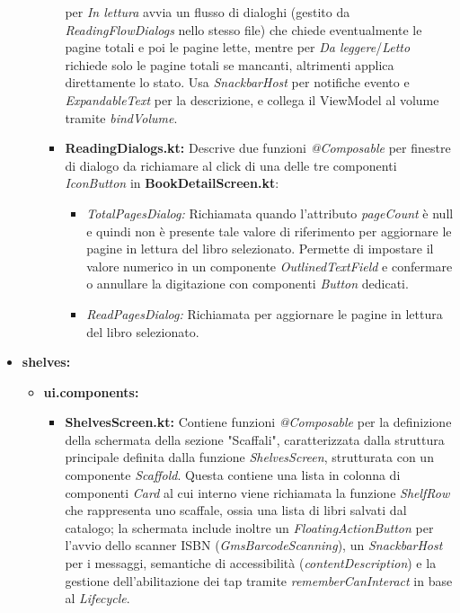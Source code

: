 \documentclass{article}
\begin{document}
\begin{itemize}
\begin{itemize}
\begin{itemize}
      per \textit{In lettura} avvia un flusso di dialoghi (gestito da \textit{ReadingFlowDialogs} nello stesso file) che chiede eventualmente le pagine totali e poi le pagine lette, mentre per \textit{Da leggere}/\textit{Letto} 
      richiede solo le pagine totali se mancanti, altrimenti applica direttamente lo stato. Usa \textit{SnackbarHost} per notifiche evento e \textit{ExpandableText} per la descrizione, e collega il ViewModel al volume tramite \textit{bindVolume}.
      \item \textbf{ReadingDialogs.kt:} Descrive due funzioni \textit{@Composable} per finestre di dialogo da richiamare al click di una delle tre componenti \textit{IconButton} in \textbf{BookDetailScreen.kt}:
      \begin{itemize}
        \item \textit{TotalPagesDialog:} Richiamata quando l'attributo \textit{pageCount} è null e quindi non è presente tale valore di riferimento per aggiornare le pagine in lettura del libro selezionato.
        Permette di impostare il valore numerico in un componente \textit{OutlinedTextField} e confermare o annullare la digitazione con componenti \textit{Button} dedicati.
        \item \textit{ReadPagesDialog:} Richiamata per aggiornare le pagine in lettura del libro selezionato.
      \end{itemize}
    \end{itemize}
  \end{itemize}
  \item \textbf{shelves:}
  \begin{itemize}
    \item \textbf{ui.components:}
    \begin{itemize}
      \item \textbf{ShelvesScreen.kt:} Contiene funzioni \textit{@Composable} per la definizione della schermata della sezione "Scaffali", caratterizzata dalla struttura principale definita dalla funzione \textit{ShelvesScreen}, 
      strutturata con un componente \textit{Scaffold}. Questa contiene una lista in colonna di componenti \textit{Card} al cui interno viene richiamata la funzione \textit{ShelfRow} che rappresenta uno scaffale, ossia una lista di libri salvati dal catalogo; 
      la schermata include inoltre un \textit{FloatingActionButton} per l’avvio dello scanner ISBN (\textit{GmsBarcodeScanning}), un \textit{SnackbarHost} per i messaggi, semantiche di accessibilità (\textit{contentDescription}) e la gestione dell’abilitazione 
      dei tap tramite \textit{rememberCanInteract} in base al \textit{Lifecycle}.

\end{itemize}
\end{itemize}
\end{itemize}
\end{document}
